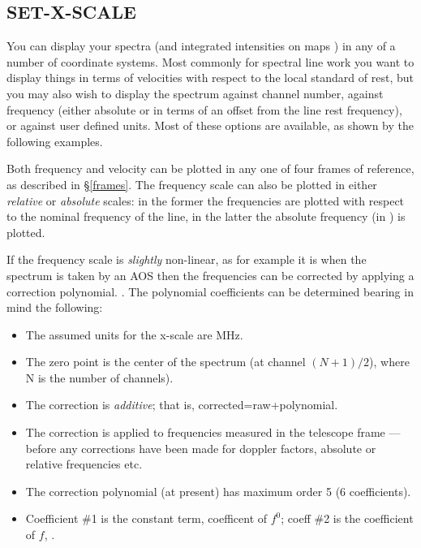 \documentclass[11pt,twoside]{report}
\begin{document}
\subsection{SET-X-SCALE} 

You can display your spectra (and integrated intensities on maps \etc) in 
any of a number of coordinate systems. Most commonly for spectral line
work you want to display things in terms of velocities with respect to
the local standard of rest, but you may also wish to display the spectrum
against channel number, against frequency (either absolute or in terms of
an offset from the line rest frequency), or against user defined units.
Most of these options are available, as shown by the following examples.

Both frequency and velocity can be plotted in any one of four frames of
reference, as described in \S\ref{frames}.
The frequency scale can also be plotted in either {\em relative} or 
{\em absolute} scales: in the former the frequencies are plotted with
respect to the nominal frequency of the line, in the latter the absolute
frequency (in \ghz) is plotted.

If the frequency scale is {\em slightly} non-linear, as for example it is
when the spectrum is taken by an AOS
then the frequencies can be corrected by applying a correction polynomial.
. The polynomial coefficients can be
determined bearing in mind the following:
\begin{itemize}
\item The assumed units for the x-scale are MHz.
\item The zero point is the center of the spectrum (\ie at channel $(N+1)/2$),
      where N is the number of channels).
\item The correction is {\em additive}; that is, corrected=raw+polynomial.
\item The correction is applied to frequencies measured in the telescope
      frame --- before any corrections have been made for doppler factors,
      absolute or relative frequencies etc.
\item The correction polynomial (at present) has maximum order 5
      (6 coefficients).
\item Coefficient \#1 is the constant term, \ie coefficent of $f^0$; coeff
      \#2 is the coefficient of $f$, \etc.
\end{itemize}
\end{document}
